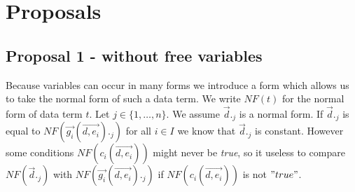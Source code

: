 \index{}\documentclass[a4paper,10pt]{article}
\theoremstyle{plain}
\theoremstyle{definition}
\newcommand{\tool}{\textit{lpeconstelm}}
\newcommand{\ovr}{\overrightarrow}
\newcommand{\pp}{process parameter}
\newcommand{\pps}{process parameters}
\newcommand{\ti}{\textit}
\newcommand{\Sig}{\nm{Sig}}
\newcommand{\Sort}{\nm{Sort}}
\newcommand{\Fun}{\nm{Fun}}
\newcommand{\ap}{{:}}
\begin{document}



\section{Proposals}
\subsection{Proposal 1 - without free variables} \label{sec:prop1}
Because variables can occur in many forms we introduce a form which allows us to take the normal form of such a data term. 
We write $NF(t)$ for the normal form of data term $t$. 
Let $j \in \lbrace 1, \ldots,  n \rbrace $. We assume $\ovr{d}._j$ is a normal form. If $\ovr{d}._j$ is equal to $NF(\ovr{g_i}(\ovr{d,e_i})._j)$ for all $i \in I$ we know that $\ovr{d}._j$ is constant. However some conditions $NF(c_i(\ovr{d,e_i}))$ might never be \ti{true}, so it useless to compare $NF(\ovr{d}._j)$ with $NF(\ovr{g_i}(\ovr{d,e_i})._j)$  if $NF(c_i(\ovr{d,e_i}))$ is not  $"true"$. \\
\end{document}

